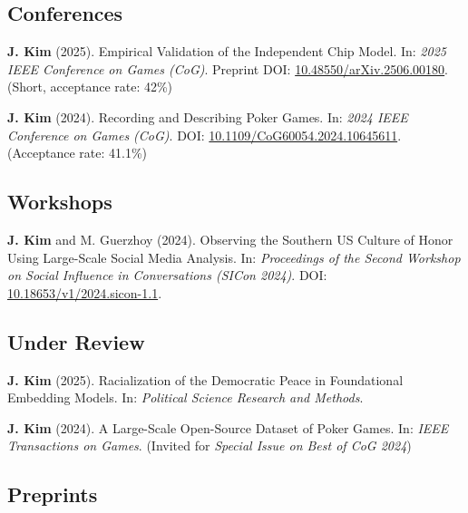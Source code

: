 \documentclass{article}
\begin{document}
	\subsection*{Conferences}

	\begin{etaremune}
		\item \textbf{J. Kim} (2025). Empirical Validation of the Independent Chip Model. In: \textit{2025 IEEE Conference on Games (CoG)}. {\small Preprint DOI: \href{https://doi.org/10.48550/arXiv.2506.00180}{10.48550/arXiv.2506.00180}. (Short, acceptance rate: 42\%)}
		\item \textbf{J. Kim} (2024). Recording and Describing Poker Games. In: \textit{2024 IEEE Conference on Games (CoG)}. {\small DOI: \href{https://doi.org/10.1109/CoG60054.2024.10645611}{10.1109/CoG60054.2024.10645611}. (Acceptance rate: 41.1\%)}
	\end{etaremune}

	\subsection*{Workshops}

	\begin{etaremune}
		\item \textbf{J. Kim} and M. Guerzhoy (2024). Observing the Southern US Culture of Honor Using Large-Scale Social Media Analysis. In: \textit{Proceedings of the Second Workshop on Social Influence in Conversations (SICon 2024)}. {\small DOI: \href{https://doi.org/10.18653/v1/2024.sicon-1.1}{10.18653/v1/2024.sicon-1.1}.}
	\end{etaremune}

	\subsection*{Under Review}

	\begin{etaremune}
		\item \textbf{J. Kim} (2025). Racialization of the Democratic Peace in Foundational Embedding Models. In: \textit{Political Science Research and Methods}.
		\item \textbf{J. Kim} (2024). A Large-Scale Open-Source Dataset of Poker Games. In: \textit{IEEE Transactions on Games}. {\small (Invited for \textit{Special Issue on Best of CoG 2024})}
	\end{etaremune}

	\subsection*{Preprints}
\end{document}
